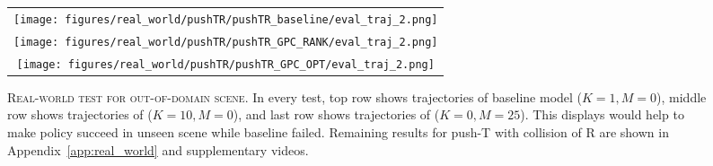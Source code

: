 

\vspace{-3mm}
\begin{figure*}[h]
    \begin{minipage}{\textwidth}
        \centering
        \begin{tabular}{c}
            \hspace{-4mm}
            \begin{minipage}{\textwidth}
                \centering
                \texttt{[image: figures/real\_world/pushTR/pushTR\_baseline/eval\_traj\_2.png]}
            \end{minipage}
            \\
            \hspace{-4mm}
            \begin{minipage}{\textwidth}
                \centering
                \texttt{[image: figures/real\_world/pushTR/pushTR\_GPC\_RANK/eval\_traj\_2.png]}
            \end{minipage}
            \\
            \hspace{-4mm}
            \begin{minipage}{\textwidth}
                \centering
                \texttt{[image: figures/real\_world/pushTR/pushTR\_GPC\_OPT/eval\_traj\_2.png]}
            \end{minipage}
            \\

        \end{tabular}
    \end{minipage}
    \vspace{-2mm}
    \caption{\textsc{Real-world test for out-of-domain scene.} In every test, top row shows trajectories of baseline model ($K=1, M=0$), middle row shows trajectories of \gpcrank ($K=10, M=0$), and last row shows trajectories of \gpcopt ($K=0, M=25$). This displays \nameshort would help to make policy succeed in unseen scene while baseline failed. Remaining results for push-T with collision of R are shown in Appendix~\ref{app:real_world} and supplementary videos.
    \label{fig:fig-real_world_main_paper_unseen}}
\end{figure*}